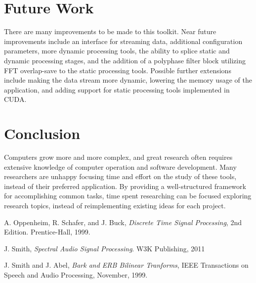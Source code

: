 \documentclass[journal]{IEEEtran}
\begin{document}
\section{Future Work}
There are many improvements to be made to this toolkit. Near future improvements include an interface for streaming data, additional configuration
parameters, more dynamic processing tools, the ability to splice static and dynamic processing stages, and the addition of a polyphase filter block utilizing FFT overlap-save to the static processing tools. Possible further extensions include making the data stream more dynamic, 
lowering the memory usage of the application, and adding support for static processing tools implemented in CUDA.

\section{Conclusion}
Computers grow more and more complex, and great research often requires extensive knowledge of computer operation and software development. Many
 researchers are unhappy focusing time and effort on the study of these tools, instead of their preferred application. By providing a well-structured
 framework for accomplishing common tasks, time spent researching can be focused exploring research topics, instead of reimplementing existing 
ideas for each project.

\begin{thebibliography}{1}
A. Oppenheim, R. Schafer, and J. Buck, \emph{Discrete Time Signal Processing}, 2nd Edition. Prentice-Hall, 1999.

J. Smith, \emph{Spectral Audio Signal Processing}. W3K Publishing, 2011

J. Smith and J. Abel, \emph{Bark and ERB Bilinear Tranforms}, IEEE Transactions on Speech and Audio Processing, November, 1999.
\end{thebibliography}






\end{document}
